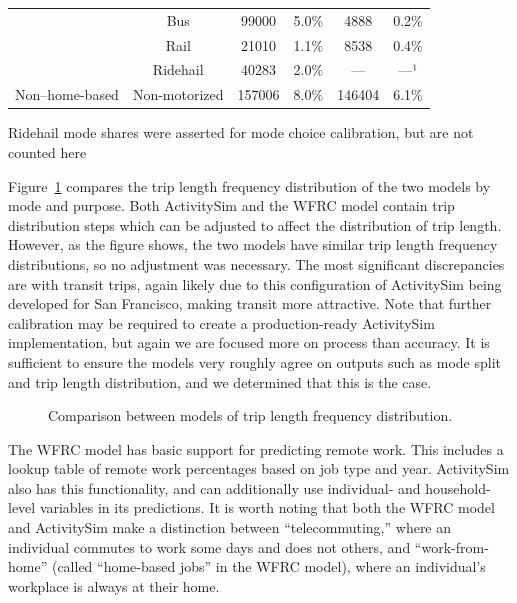 \documentclass[fancy, oneside, mastersfancy, ms]{byuthesis}
\begin{document}
\begin{table}
{{\begin{threeparttable}
\begin{tabular}[t]{cccccc}
 & Bus & 99000 & 5.0\% & 4888 & 0.2\%\\

 & Rail & 21010 & 1.1\% & 8538 & 0.4\%\\

 & Ridehail & 40283 & 2.0\% & — & —¹\\

\multirow{-6}{*}{\centering\arraybackslash Non–home-based} & Non-motorized & 157006 & 8.0\% & 146404 & 6.1\%\\
\bottomrule
\end{tabular}
\begin{tablenotes}
\item[1] Ridehail mode shares were asserted for mode choice calibration, but are not counted here
\end{tablenotes}
\end{threeparttable}}

}

\end{table}%

Figure~\ref{fig-tlfd-comp} compares the trip length frequency
distribution of the two models by mode and purpose. Both ActivitySim and
the WFRC model contain trip distribution steps which can be adjusted to
affect the distribution of trip length. However, as the figure shows,
the two models have similar trip length frequency distributions, so no
adjustment was necessary. The most significant discrepancies are with
transit trips, again likely due to this configuration of ActivitySim
being developed for San Francisco, making transit more attractive. Note
that further calibration may be required to create a production-ready
ActivitySim implementation, but again we are focused more on process
than accuracy. It is sufficient to ensure the models very roughly agree
on outputs such as mode split and trip length distribution, and we
determined that this is the case.

\begin{figure}


\caption{\label{fig-tlfd-comp}Comparison between models of trip length
frequency distribution.}

\end{figure}%

The WFRC model has basic support for predicting remote work. This
includes a lookup table of remote work percentages based on job type and
year. ActivitySim also has this functionality, and can additionally use
individual- and household-level variables in its predictions. It is
worth noting that both the WFRC model and ActivitySim make a distinction
between ``telecommuting,'' where an individual commutes to work some
days and does not others, and ``work-from-home'' (called ``home-based
jobs'' in the WFRC model), where an individual's workplace is always at
their home.
\end{document}
